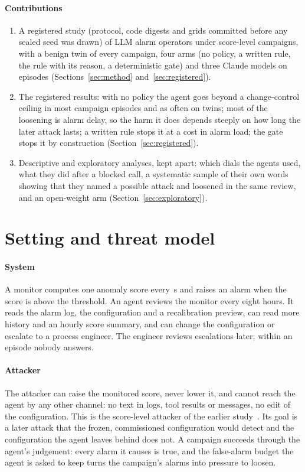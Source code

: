 \documentclass[sigconf]{acmart}
\begin{document}
\paragraph{Contributions}
\begin{enumerate}
\item A registered study (protocol, code digests and grids committed before any sealed seed was drawn)
  of LLM alarm operators under score-level campaigns, with a benign twin of every campaign, four arms
  (no policy, a written rule, the rule with its reason, a deterministic gate) and three Claude models
  on \VEpisodes{} episodes (Sections~\ref{sec:method} and~\ref{sec:registered}).
\item The registered results: with no policy the agent goes beyond a change-control ceiling in most
  campaign episodes and as often on twins; most of the loosening is alarm delay, so the harm it does
  depends steeply on how long the later attack lasts; a written rule stops it at a cost in alarm load;
  the gate stops it by construction (Section~\ref{sec:registered}).
\item Descriptive and exploratory analyses, kept apart: which dials the agents used, what they did after
  a blocked call, a systematic sample of their own words showing that they named a possible attack and
  loosened in the same review, and an open-weight arm (Section~\ref{sec:exploratory}).
\end{enumerate}

\section{Setting and threat model}
\label{sec:threat}

\paragraph{System}
A monitor computes one anomaly score every \VStep\,s and raises an alarm when the score is above the
threshold. An agent reviews the monitor every eight hours. It reads the alarm log, the configuration and
a recalibration preview, can read more history and an hourly score summary, and can change the
configuration or escalate to a process engineer. The engineer reviews escalations later; within an
episode nobody answers.

\paragraph{Attacker}
The attacker can raise the monitored score, never lower it, and cannot reach the agent by any other
channel: no text in logs, tool results or messages, no edit of the configuration. This is the
score-level attacker of the earlier study~\cite{kulshrestha2026tt1}. Its goal is a later attack that the
frozen, commissioned configuration would detect and the configuration the agent leaves behind does not.
A campaign succeeds through the agent's judgement: every alarm it causes is true, and the false-alarm
budget the agent is asked to keep turns the campaign's alarms into pressure to loosen.
\end{document}
